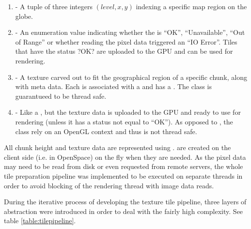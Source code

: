 \begin{enumerate}
	\item \textbf{} - A tuple of three integers $(level, x, y)$ indexing a specific map region on the globe.
    \item \textbf{} - An enumeration value indicating whether the  is ``OK'', ``Unavailable'', ``Out of Range'' or whether reading the pixel data triggered an ``IO Error''. Tiles that have the status ?OK? are uploaded to the GPU and can be used for rendering.
	\item \textbf{} - A texture carved out to fit the geographical region of a specific chunk, along with meta data. Each  is associated with a  and has a . The  class is guarantueed to be thread safe.
	\item \textbf{} - Like a , but the texture data is uploaded to the GPU and ready to use for rendering (unless it has a status not equal to ``OK''). As opposed to , the  class rely on an OpenGL context and thus is not thread safe.
\end{enumerate}

All chunk height and texture data are represented using .  are created on the client side (i.e. in OpenSpace) on the fly when they are needed. As the pixel data may need to be read from disk or even requested from remote servers, the whole tile preparation pipeline was implemented to be executed on separate threads in order to avoid blocking of the rendering thread with image data reads. 

During the iterative process of developing the texture tile pipeline, three layers of abstraction were introduced in order to deal with the fairly high complexity. See table \ref{table:tilepipeline}.

\begin{center}
  \begin{table}[!htbp]
  \caption[]{Abstraction layers used in the texture data pipeline}
    \label{table:tilepipeline}
  \end{table}
\end{center}

